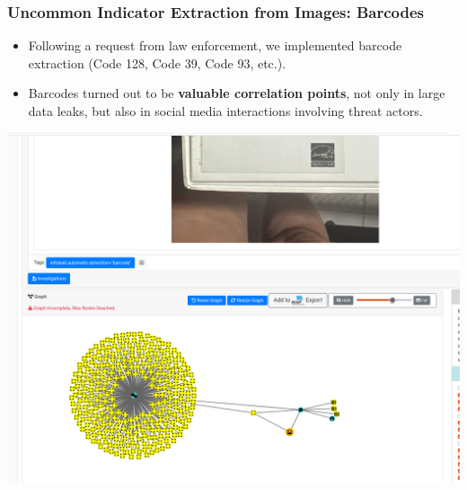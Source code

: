 \documentclass[10pt,aspectratio=169, colorlinks=true, linkcolor=circlBlue]{beamer}
\begin{document}
\begin{frame}
    \frametitle{Uncommon Indicator Extraction from Images: Barcodes}
    \begin{itemize}
        \item Following a request from law enforcement, we implemented barcode extraction (Code 128, Code 39, Code 93, etc.).
	\item Barcodes turned out to be {\bf valuable correlation points}, not only in large data leaks, but also in social media interactions involving threat actors.
    \end{itemize}
    \begin{center}
        \includegraphics[scale=0.15]{./img/barcode.png}
    \end{center}
\end{frame}
\end{document}
